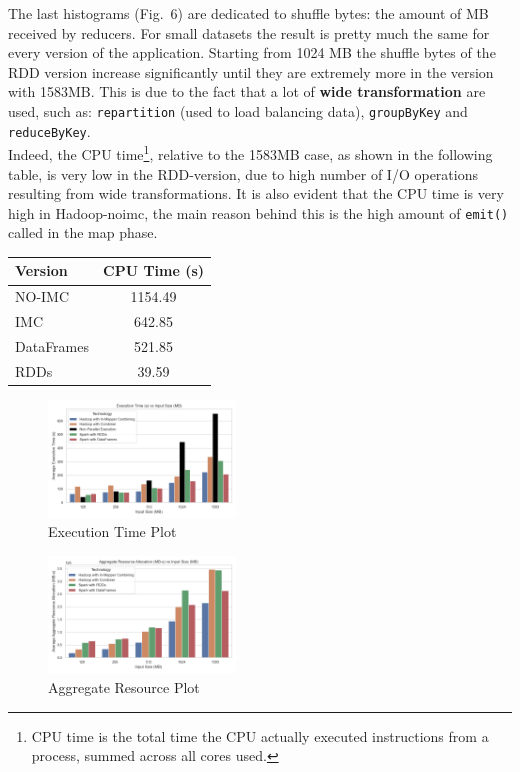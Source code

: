 The last histograms (Fig.~6) are dedicated to shuffle bytes: the amount of MB received by reducers. For small datasets the result is pretty much the same for every version of the application. Starting from 1024 MB the shuffle bytes of the RDD version increase significantly until they are extremely more in the version with 1583MB. This is due to the fact that a lot of \textbf{wide transformation} are used, such as: \texttt{repartition} (used to load balancing data), \texttt{groupByKey} and \texttt{reduceByKey}.\\
Indeed, the CPU time\footnote{CPU time is the total time the CPU actually executed instructions from a process, summed across all cores used.}, relative to the 1583MB case, as shown in the following table, is very low in the RDD-version, due to high number of I/O operations resulting from wide transformations. It is also evident that the CPU time is very high in Hadoop-noimc, the main reason behind this is the high amount of \texttt{emit()} called in the map phase.
\begin{table}[H]
	\centering
	\begin{tabular}{lc}
		\hline
		\textbf{Version} & \textbf{CPU Time (s)} \\
		\hline
		NO-IMC    & 1154.49 \\
		IMC  & 642.85 \\
		DataFrames & 521.85 \\
		RDDs       & 39.59 \\
		\hline
	\end{tabular}
	\label{tab:avg-cpu-time}
\end{table}
\begin{figure}[H]
	\centering
	\includegraphics[width=0.444\textwidth]{images/Fig_Execution_Time.png}
	\caption{Execution Time Plot}
	\label{fig:execution-time}
\end{figure}
\begin{figure}[H]
	\centering
	\includegraphics[width=0.444\textwidth]{images/Fig_Aggregate_Resource_Allocation.png}
	\caption{Aggregate Resource Plot}
	\label{fig:aggregate-resource-allocation}
\end{figure}
